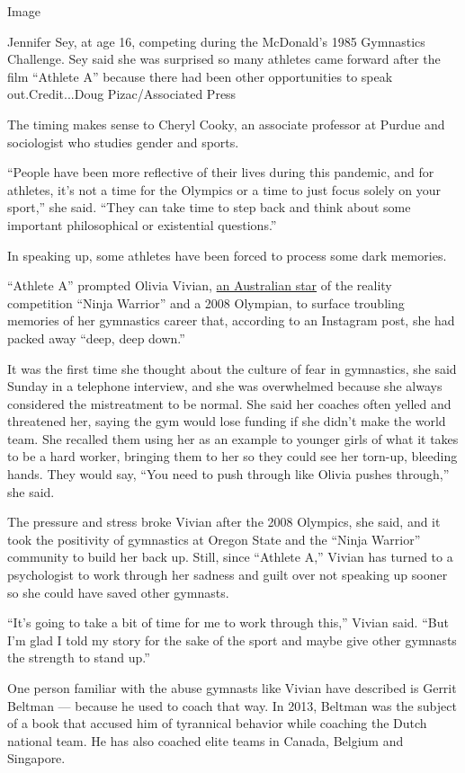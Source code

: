 Image

Jennifer Sey, at age 16, competing during the McDonald's 1985 Gymnastics
Challenge. Sey said she was surprised so many athletes came forward
after the film ``Athlete A'' because there had been other opportunities
to speak out.Credit...Doug Pizac/Associated Press

The timing makes sense to Cheryl Cooky, an associate professor at Purdue
and sociologist who studies gender and sports.

``People have been more reflective of their lives during this pandemic,
and for athletes, it's not a time for the Olympics or a time to just
focus solely on your sport,'' she said. ``They can take time to step
back and think about some important philosophical or existential
questions.''

In speaking up, some athletes have been forced to process some dark
memories.

``Athlete A'' prompted Olivia Vivian,
\href{https://www.youtube.com/watch?v=1WZPvwQf9AU}{an Australian star}
of the reality competition ``Ninja Warrior'' and a 2008 Olympian, to
surface troubling memories of her gymnastics career that, according to
an Instagram post, she had packed away ``deep, deep down.''

It was the first time she thought about the culture of fear in
gymnastics, she said Sunday in a telephone interview, and she was
overwhelmed because she always considered the mistreatment to be normal.
She said her coaches often yelled and threatened her, saying the gym
would lose funding if she didn't make the world team. She recalled them
using her as an example to younger girls of what it takes to be a hard
worker, bringing them to her so they could see her torn-up, bleeding
hands. They would say, ``You need to push through like Olivia pushes
through,'' she said.

The pressure and stress broke Vivian after the 2008 Olympics, she said,
and it took the positivity of gymnastics at Oregon State and the ``Ninja
Warrior'' community to build her back up. Still, since ``Athlete A,''
Vivian has turned to a psychologist to work through her sadness and
guilt over not speaking up sooner so she could have saved other
gymnasts.

``It's going to take a bit of time for me to work through this,'' Vivian
said. ``But I'm glad I told my story for the sake of the sport and maybe
give other gymnasts the strength to stand up.''

One person familiar with the abuse gymnasts like Vivian have described
is Gerrit Beltman --- because he used to coach that way. In 2013,
Beltman was the subject of a book that accused him of tyrannical
behavior while coaching the Dutch national team. He has also coached
elite teams in Canada, Belgium and Singapore.

